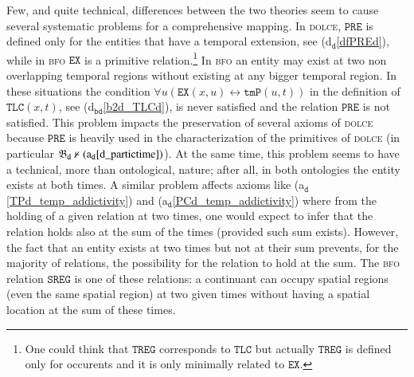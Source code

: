 \documentclass[ao]{iosart2x}
\newcommand{\nb}[1]{\textcolor{red}{$|$}\marginpar{\hspace*{-0cm}\parbox{20mm}{\scriptsize\raggedright\textcolor{red}{#1}}}}
\newcommand{\dolceAxLabel}{\textrm{a$_\texttt{d}$}}
\newcommand{\dolceDefLabel}{\textrm{d$_\texttt{d}$}}
\newcommand{\bdDefLabel}{\textrm{d$_\texttt{bd}$}}
\newcommand{\bdThrLabel}{\textrm{t$_\texttt{bd}$}}
\newcommand{\refdolceax}[1]{({\dolceAxLabel}\ref{#1})}
\newcommand{\refdolcedf}[1]{({\dolceDefLabel}\ref{#1})}
\newcommand{\refbddf}[1]{({\bdDefLabel}\ref{#1})}
\newcommand{\refbdth}[1]{({\bdThrLabel}\ref{#1})}
\newcommand{\pr}[1]{\mathtt{#1}}
\newcommand{\ifif}{\leftrightarrow}
\newcommand{\dolce}{{\textsc{dolce}}}
\newcommand{\bfo}{{\textsc{bfo}}}
\newcommand {\thbfobdmap} {\ensuremath{\mathfrak{B}_\texttt{d}}}
\newcommand {\PREd} {\ensuremath{\pr{PRE}}}
\newcommand {\TLCd} {\ensuremath{\pr{TLC}}}
\newcommand{\bfotpart}{\pr{tmP}}
\newcommand{\bfoexist}{\pr{EX}}
\newcommand{\bfosregof}{\pr{SREG}}
\newcommand{\bfotregof}{\pr{TREG}}
\begin{document}
Few, and quite technical, differences between the two theories seem to cause several systematic problems for a comprehensive mapping. In {\dolce}, $\PREd$ is defined only for the entities that have a temporal extension, see \refdolcedf{dfPREd}, while in {\bfo} $\bfoexist$ is a primitive relation.\footnote{One could think that $\bfotregof$ corresponds to $\TLCd$ but actually $\bfotregof$ is defined only for occurents and it is only minimally related to $\bfoexist$.} %
In {\bfo} an entity may exist at two non overlapping temporal regions without existing at any bigger temporal region. In these situations the condition $\forall u(\bfoexist(x,u) \ifif \bfotpart(u,t))$ in the definition of $\TLCd(x,t)$, see \refbddf{b2d_TLCd}, is never satisfied and the relation $\PREd$ is not satisfied. This problem impacts the preservation of several axioms of {\dolce}  %
because $\PREd$ is heavily used in the characterization of the primitives of {\dolce} (in particular ${\thbfobdmap \nvdash \refdolceax{d_partictime}}$). At the same time, this problem seems to have a technical, more than ontological, nature; after all, in both ontologies the entity exists at both times. A similar problem affects axioms like  \refdolceax{TPd_temp_addictivity} and \refdolceax{PCd_temp_addictivity} where from the holding of a given relation at two times, one would expect to infer that the relation holds also at the sum of the times (provided such sum exists). 
However, the fact that an entity exists at two times but not at their sum prevents, for the majority of relations, the possibility for the relation to hold at the sum.%
%
%
The {\bfo} relation $\bfosregof$ is one of these relations: a continuant can occupy spatial regions (even the same spatial region) at two given times without having a spatial location at the sum of these times. %
\end{document}
